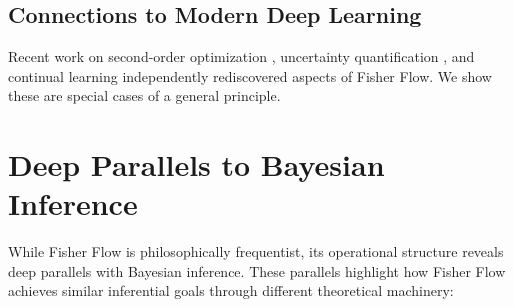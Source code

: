 \documentclass[11pt]{article}
\begin{document}
\subsection{Connections to Modern Deep Learning}

Recent work on second-order optimization \cite{botev2017practical}, uncertainty quantification \cite{zhang2018noisy}, and continual learning \cite{kirkpatrick2017overcoming} independently rediscovered aspects of Fisher Flow. We show these are special cases of a general principle.

\section{Deep Parallels to Bayesian Inference}

While Fisher Flow is philosophically frequentist, its operational structure reveals deep parallels with Bayesian inference. These parallels highlight how Fisher Flow achieves similar inferential goals through different theoretical machinery:
\end{document}
